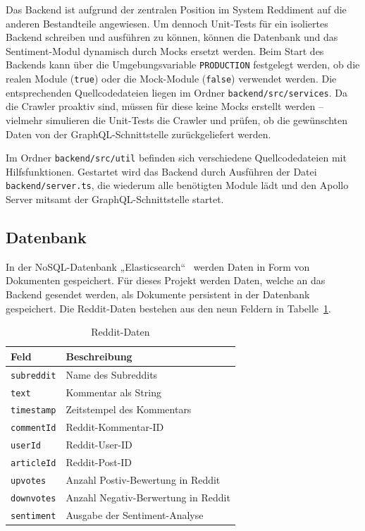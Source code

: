 \documentclass[a4paper, 10pt, conference]{IEEEtran}
\begin{document}
Das Backend ist aufgrund der zentralen Position im System Reddiment auf die anderen Bestandteile angewiesen. Um dennoch Unit-Tests für ein isoliertes Backend schreiben und ausführen zu können, können die Datenbank und das Sentiment-Modul dynamisch durch Mocks ersetzt werden. Beim Start des Backends kann über die Umgebungsvariable \texttt{PRODUCTION} festgelegt werden, ob die realen Module (\texttt{true}) oder die Mock-Module (\texttt{false}) verwendet werden. Die entsprechenden Quellcodedateien liegen im Ordner \texttt{backend/src/services}. Da die Crawler proaktiv sind, müssen für diese keine Mocks erstellt werden -- vielmehr simulieren die Unit-Tests die Crawler und prüfen, ob die gewünschten Daten von der GraphQL-Schnittstelle zurückgeliefert werden.

Im Ordner \texttt{backend/src/util} befinden sich verschiedene Quellcodedateien mit Hilfsfunktionen. Gestartet wird das Backend durch Ausführen der Datei \texttt{backend/server.ts}, die wiederum alle benötigten Module lädt und den Apollo Server mitsamt der GraphQL-Schnittstelle startet.


\subsection{Datenbank} \label{sub:database}
In der NoSQL-Datenbank „Elasticsearch“~\cite{elasticsearch} werden Daten in Form von Dokumenten gespeichert. Für dieses Projekt werden Daten, welche an das Backend gesendet werden, als Dokumente persistent in der Datenbank gespeichert. Die Reddit-Daten bestehen aus den neun Feldern in Tabelle~\ref{tab:reddit}.
\begin{table}[h!]
\begin{center}
\caption{Reddit-Daten}
\label{tab:reddit}
\begin{tabular}{|l|l|}
\textbf{Feld} & \textbf{Beschreibung}\\
\hline
\texttt{subreddit} 		& Name des Subreddits\\
\texttt{text} 			& Kommentar als String \\
\texttt{timestamp} 		& Zeitstempel des Kommentars\\
\texttt{commentId} 		& Reddit-Kommentar-ID\\
\texttt{userId} 		& Reddit-User-ID\\
\texttt{articleId} 		& Reddit-Post-ID\\
\texttt{upvotes} 		& Anzahl Postiv-Bewertung in Reddit\\
\texttt{downvotes} 		& Anzahl Negativ-Berwertung in Reddit \\
\texttt{sentiment} 		& Ausgabe der Sentiment-Analyse\\
\end{tabular}
\end{center}
\end{table}
\end{document}
